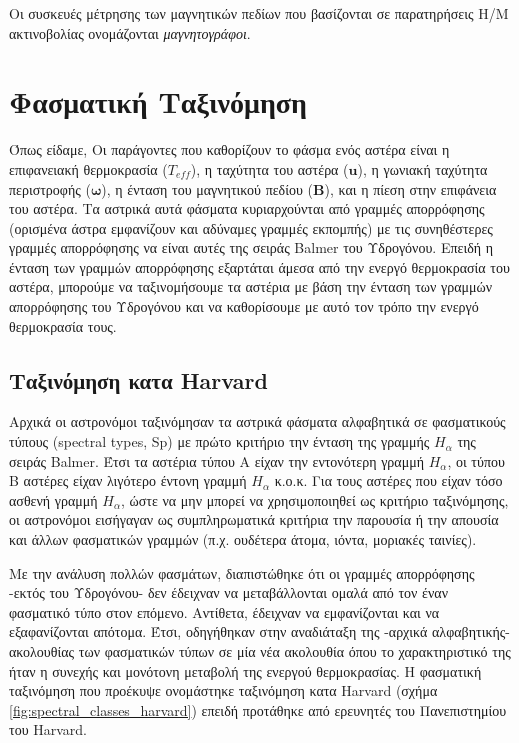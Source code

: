 Οι συσκευές μέτρησης των μαγνητικών πεδίων που βασίζονται σε παρατηρήσεις Η/Μ ακτινοβολίας ονομάζονται \textit{μαγνητογράφοι}. 



\section{Φασματική Ταξινόμηση}
Όπως είδαμε, Οι παράγοντες που καθορίζουν το φάσμα ενός αστέρα είναι η επιφανειακή θερμοκρασία ($ T_{eff}$), η ταχύτητα του αστέρα ($\boldsymbol{u}$), η γωνιακή ταχύτητα περιστροφής ($\boldsymbol{\omega}$), η ένταση του μαγνητικού πεδίου ($\boldsymbol{B}$), και η πίεση στην επιφάνεια του αστέρα. Τα αστρικά αυτά φάσματα κυριαρχούνται από γραμμές απορρόφησης (ορισμένα άστρα εμφανίζουν και αδύναμες γραμμές εκπομπής) με τις συνηθέστερες γραμμές απορρόφησης να είναι αυτές της σειράς Balmer του Υδρογόνου. Επειδή η ένταση των γραμμών απορρόφησης εξαρτάται άμεσα από την ενεργό θερμοκρασία του αστέρα, μπορούμε να ταξινομήσουμε τα αστέρια με βάση την ένταση των γραμμών απορρόφησης του Υδρογόνου και να καθορίσουμε με αυτό τον τρόπο την ενεργό θερμοκρασία τους.



\subsection{Ταξινόμηση κατα Harvard}
Αρχικά οι αστρονόμοι ταξινόμησαν τα αστρικά φάσματα αλφαβητικά σε φασματικούς τύπους (spectral types, Sp) με πρώτο κριτήριο την ένταση της γραμμής $H_{\alpha}$ της σειράς Balmer. Έτσι τα αστέρια τύπου Α είχαν την εντονότερη γραμμή $H_{\alpha}$, οι τύπου Β αστέρες είχαν λιγότερο έντονη γραμμή $H_{\alpha}$ κ.ο.κ.
Για τους αστέρες που είχαν τόσο ασθενή γραμμή $H_{\alpha}$, ώστε να μην μπορεί να χρησιμοποιηθεί ως κριτήριο ταξινόμησης, οι αστρονόμοι εισήγαγαν ως συμπληρωματικά κριτήρια την παρουσία ή την απουσία και άλλων φασματικών γραμμών (π.χ. ουδέτερα άτομα, ιόντα, μοριακές ταινίες).

Με την ανάλυση πολλών φασμάτων, διαπιστώθηκε ότι οι γραμμές απορρόφησης -εκτός του Υδρογόνου- δεν έδειχναν να μεταβάλλονται ομαλά από τον έναν φασματικό τύπο στον επόμενο. Αντίθετα, έδειχναν να εμφανίζονται και να εξαφανίζονται απότομα. Έτσι, οδηγήθηκαν στην αναδιάταξη της -αρχικά αλφαβητικής- ακολουθίας των φασματικών τύπων σε μία νέα ακολουθία όπου το χαρακτηριστικό της ήταν η συνεχής και μονότονη μεταβολή της ενεργού θερμοκρασίας. Η φασματική ταξινόμηση που προέκυψε ονομάστηκε ταξινόμηση κατα Harvard (σχήμα \ref{fig:spectral_classes_harvard}) επειδή προτάθηκε από ερευνητές του Πανεπιστημίου του Harvard.

